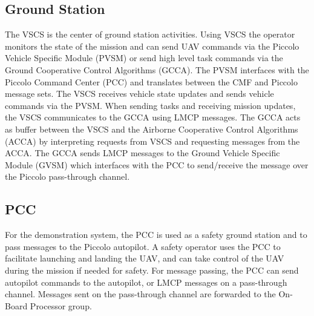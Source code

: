 \documentclass[letterpaper, 12 pt, conference]{ieeeconf}  %
\theoremstyle{definition}
\begin{document}


\subsection{Ground Station}
The VSCS is the center of ground station activities. Using VSCS the operator monitors the state of the mission and can send UAV commands via the Piccolo Vehicle Specific Module (PVSM) or send high level task commands via the Ground Cooperative Control Algorithms (GCCA). The PVSM interfaces with the Piccolo Command Center (PCC) and translates between the CMF and Piccolo message sets. The VSCS receives vehicle state updates and sends vehicle commands via the PVSM. When sending tasks and receiving mission updates, the VSCS communicates to the GCCA using LMCP messages. The GCCA acts as buffer between the VSCS and the Airborne Cooperative Control Algorithms (ACCA) by interpreting requests from VSCS and requesting messages from the ACCA. The GCCA sends LMCP messages to the Ground Vehicle Specific Module (GVSM) which interfaces with the PCC to send/receive the message over the Piccolo pass-through channel.

\subsection{PCC}
For the demonstration system, the PCC is used as a safety ground station and to pass messages to the Piccolo autopilot. A safety operator uses the PCC to facilitate launching and landing the UAV, and can take control of the UAV during the mission if needed for safety. For message passing, the PCC can send autopilot commands to the autopilot, or LMCP messages on a pass-through channel. Messages sent on the pass-through channel are forwarded to the On-Board Processor group.
\end{document}
